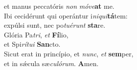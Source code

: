 \evenverse et manus peccatóris \textit{non} \textit{mó}\textit{ve}\textbf{at} me.\\
\oddverse Ibi cecidérunt qui operántur i\textit{ni}\textit{qui}\textbf{tá}tem:~\*\\
\oddverse expúlsi sunt, nec po\textit{tu}\textit{é}\textit{runt} \textbf{sta}re.\\
\evenverse Glória Pa\textit{tri}, \textit{et} \textbf{Fí}lio,~\*\\
\evenverse et Spi\textit{rí}\textit{tu}\textit{i} \textbf{San}cto.\\
\oddverse Sicut erat in princípio, et \textit{nunc}, \textit{et} \textbf{sem}per,~\*\\
\oddverse et in sǽcula sæ\textit{cu}\textit{ló}\textit{rum}. \textbf{A}men.\\
